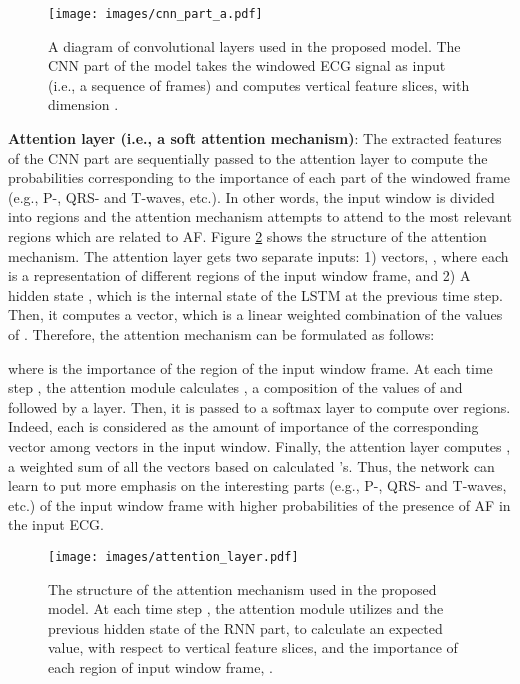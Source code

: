 \documentclass[conference]{IEEEtran}
\begin{document}
\begin{figure}[htb]
\centering
\texttt{[image: images/cnn\_part\_a.pdf]}
  \caption{A diagram of convolutional layers used in the proposed model. The CNN part of the model takes the windowed ECG signal as input (i.e., a sequence of frames) and computes vertical feature slices,  with dimension .}
  \label{fig:cnn_part}

\end{figure}

\noindent\textbf{Attention layer (i.e., a soft attention mechanism)}: The extracted features of the CNN part are sequentially passed to the attention layer to compute the probabilities corresponding to the importance of each part of the windowed frame (e.g., P-, QRS- and T-waves, etc.). In other words, the input window is divided into  regions and the attention mechanism attempts to attend to the most relevant regions which are related to AF. Figure \ref{fig:attention_layer} shows the structure of the attention mechanism. The attention layer gets two separate inputs: 1)  vectors, , where each  is a representation of different regions of the input window frame, and 2) A hidden state , which is the internal state of the LSTM at the previous time step. Then, it computes a vector,  which is a linear weighted combination of the values of . Therefore, the attention mechanism can be formulated as follows:

where  is the importance of the region  of the input window frame.
At each time step , the attention module calculates , a composition of the values of  and  followed by a  layer. Then, it is passed to a softmax layer to compute  over  regions. Indeed, each  is considered as the amount of importance of the corresponding vector  among  vectors in the input window. Finally, the attention layer computes , a weighted sum of all the vectors  based on calculated 's. Thus, the network can learn to put more emphasis on the interesting parts (e.g., P-, QRS- and T-waves, etc.) of the input window frame with higher probabilities of the presence of AF in the input ECG.


\begin{figure}[htb]
\centering
\texttt{[image: images/attention\_layer.pdf]}
  \caption{The structure of the attention mechanism used in the proposed model. At each time step , the attention module utilizes  and the previous hidden state of the RNN part,  to calculate an expected value,   with respect to  vertical feature slices,  and the importance of each region of input window frame, .}
  \label{fig:attention_layer}

\end{figure}  
\end{document}
